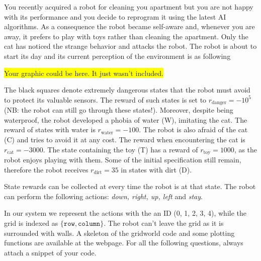 
\newif\ifvimbug
\vimbugfalse

\ifvimbug

\fi


You recently acquired a robot for cleaning you apartment but you are not happy with its performance and you decide to reprogram it using the latest AI algorithms. As a consequence the robot became self-aware and, whenever you are away, it prefers to play with toys rather than cleaning the apartment. Only the cat has noticed the strange behavior and attacks the robot. The robot is about to start its day and its current perception of the environment is as following 
%
\begin{center}
	\colorbox{yellow}{Your graphic could be here. It just wasn't included.}
\end{center}
%
The black squares denote extremely dangerous states that the robot must avoid to protect its valuable sensors. The reward of such states is set to $r_\textrm{danger}=-10^5$ (NB: the robot can still go through these states!). Moreover, despite being waterproof, the robot developed a phobia of water (W), imitating the cat. The reward of states with water is $r_\textrm{water}=-100$. The robot is also afraid of the cat (C) and tries to avoid it at any cost. The reward when encountering the cat is $r_\textrm{cat}=-3000$. The state containing the toy (T) has a reward of $r_\textrm{toy}=1000$, as the robot enjoys playing with them. Some of the initial specification still remain, therefore the robot receives $r_\textrm{dirt}=35$ in states with dirt (D).

State rewards can be collected at every time the robot is at that state. 
The robot can perform the following actions: \textit{down, right, up, left} and
\textit{stay}.

In our system we represent the actions with the an ID (0, 1, 2, 3, 4), while the grid is indexed as $\{ \texttt{row}, \texttt{column} \}$. The robot can't leave the grid as it is surrounded with walls.
A skeleton of the gridworld code and some plotting functions are available at the webpage.
For all the following questions, always attach a snippet of your code.


